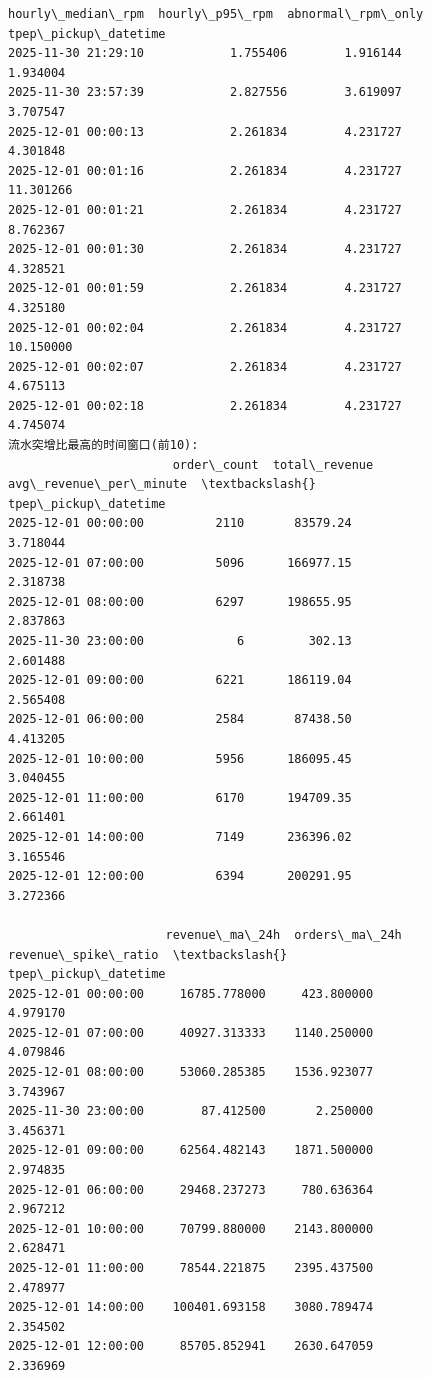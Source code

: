 \documentclass[11pt]{article}
\begin{document}
\begin{Verbatim}[commandchars=\\\{\}]
                      hourly\_median\_rpm  hourly\_p95\_rpm  abnormal\_rpm\_only
tpep\_pickup\_datetime
2025-11-30 21:29:10            1.755406        1.916144           1.934004
2025-11-30 23:57:39            2.827556        3.619097           3.707547
2025-12-01 00:00:13            2.261834        4.231727           4.301848
2025-12-01 00:01:16            2.261834        4.231727          11.301266
2025-12-01 00:01:21            2.261834        4.231727           8.762367
2025-12-01 00:01:30            2.261834        4.231727           4.328521
2025-12-01 00:01:59            2.261834        4.231727           4.325180
2025-12-01 00:02:04            2.261834        4.231727          10.150000
2025-12-01 00:02:07            2.261834        4.231727           4.675113
2025-12-01 00:02:18            2.261834        4.231727           4.745074
流水突增比最高的时间窗口(前10):
                       order\_count  total\_revenue  avg\_revenue\_per\_minute  \textbackslash{}
tpep\_pickup\_datetime
2025-12-01 00:00:00          2110       83579.24                3.718044
2025-12-01 07:00:00          5096      166977.15                2.318738
2025-12-01 08:00:00          6297      198655.95                2.837863
2025-11-30 23:00:00             6         302.13                2.601488
2025-12-01 09:00:00          6221      186119.04                2.565408
2025-12-01 06:00:00          2584       87438.50                4.413205
2025-12-01 10:00:00          5956      186095.45                3.040455
2025-12-01 11:00:00          6170      194709.35                2.661401
2025-12-01 14:00:00          7149      236396.02                3.165546
2025-12-01 12:00:00          6394      200291.95                3.272366

                      revenue\_ma\_24h  orders\_ma\_24h  revenue\_spike\_ratio  \textbackslash{}
tpep\_pickup\_datetime
2025-12-01 00:00:00     16785.778000     423.800000             4.979170
2025-12-01 07:00:00     40927.313333    1140.250000             4.079846
2025-12-01 08:00:00     53060.285385    1536.923077             3.743967
2025-11-30 23:00:00        87.412500       2.250000             3.456371
2025-12-01 09:00:00     62564.482143    1871.500000             2.974835
2025-12-01 06:00:00     29468.237273     780.636364             2.967212
2025-12-01 10:00:00     70799.880000    2143.800000             2.628471
2025-12-01 11:00:00     78544.221875    2395.437500             2.478977
2025-12-01 14:00:00    100401.693158    3080.789474             2.354502
2025-12-01 12:00:00     85705.852941    2630.647059             2.336969


\end{Verbatim}
\end{document}
